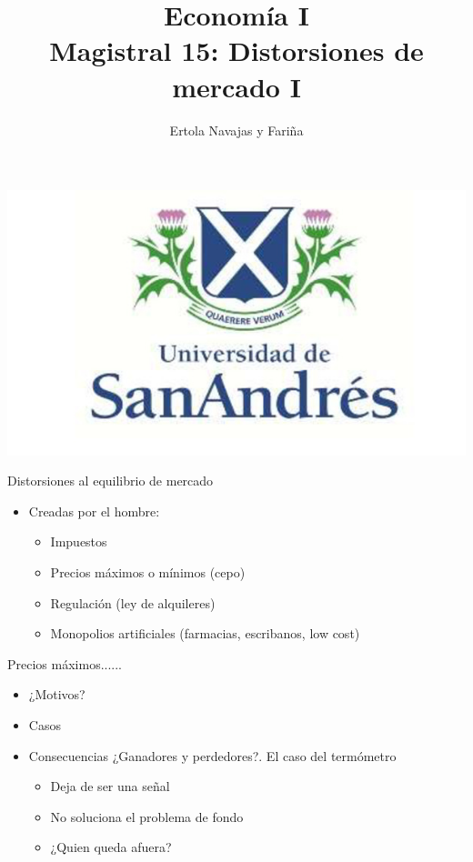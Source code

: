 \documentclass{beamer}
\title[Economía I]{Economía I \vspace{4mm}
\\ Magistral 15: Distorsiones de mercado I}
\date{}
\author[Ertola Navajas y Fariña]{Ertola Navajas y Fariña}
\institute[]{Universidad de San Andrés}
\begin{document}
\begin{frame}
\titlepage
\centering
\includegraphics[scale=0.2]{Slides Principios de Economia/Figures/logoUDESA.jpg} 
\end{frame}

\begin{frame}{Distorsiones al equilibrio de mercado}
    \begin{itemize}
        \item Creadas por el hombre:
        \begin{itemize}
            \item Impuestos
             \vspace{1mm}
            \item Precios máximos o mínimos (cepo)
             \vspace{1mm}
            \item Regulación (ley de alquileres)
            \vspace{1mm}
            \item Monopolios artificiales (farmacias, escribanos, low cost)
        \end{itemize}
    \end{itemize}
\end{frame}

\begin{frame}{Precios máximos......}
\begin{itemize}
    \item ¿Motivos?
    \item Casos
    \item Consecuencias ¿Ganadores y perdedores?. El caso del termómetro
    \begin{itemize}
        \item Deja de ser una señal
        \item No soluciona el problema de fondo
        \item ¿Quien queda afuera?
    \end{itemize}
\end{itemize}
\end{frame}
\end{document}
